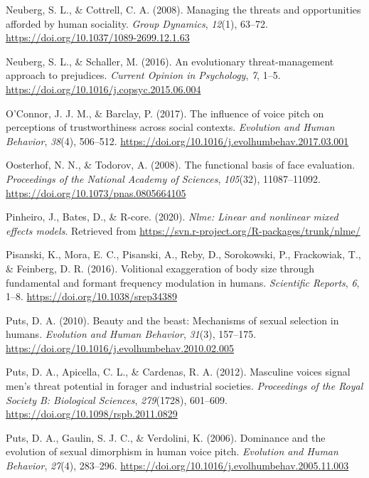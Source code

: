 \documentclass[
  english,
  man, noextraspace,floatsintext]{apa6}
\newlength{\cslhangindent}
\newenvironment{cslreferences}%
  {\setlength{\parindent}{0pt}%
  \everypar{\setlength{\hangindent}{\cslhangindent}}\ignorespaces}%
  {\par}
\begin{document}
\begin{cslreferences}
\leavevmode\hypertarget{ref-Neuberg2008}{}%
Neuberg, S. L., \& Cottrell, C. A. (2008). Managing the threats and opportunities afforded by human sociality. \emph{Group Dynamics}, \emph{12}(1), 63--72. \url{https://doi.org/10.1037/1089-2699.12.1.63}

\leavevmode\hypertarget{ref-Neuberg2016}{}%
Neuberg, S. L., \& Schaller, M. (2016). An evolutionary threat-management approach to prejudices. \emph{Current Opinion in Psychology}, \emph{7}, 1--5. \url{https://doi.org/10.1016/j.copsyc.2015.06.004}

\leavevmode\hypertarget{ref-OConnor2017}{}%
O'Connor, J. J. M., \& Barclay, P. (2017). The influence of voice pitch on perceptions of trustworthiness across social contexts. \emph{Evolution and Human Behavior}, \emph{38}(4), 506--512. \url{https://doi.org/10.1016/j.evolhumbehav.2017.03.001}

\leavevmode\hypertarget{ref-Oosterhof2008}{}%
Oosterhof, N. N., \& Todorov, A. (2008). The functional basis of face evaluation. \emph{Proceedings of the National Academy of Sciences}, \emph{105}(32), 11087--11092. \url{https://doi.org/10.1073/pnas.0805664105}

\leavevmode\hypertarget{ref-R-nlme}{}%
Pinheiro, J., Bates, D., \& R-core. (2020). \emph{Nlme: Linear and nonlinear mixed effects models}. Retrieved from \url{https://svn.r-project.org/R-packages/trunk/nlme/}

\leavevmode\hypertarget{ref-Pisanski2016}{}%
Pisanski, K., Mora, E. C., Pisanski, A., Reby, D., Sorokowski, P., Frackowiak, T., \& Feinberg, D. R. (2016). Volitional exaggeration of body size through fundamental and formant frequency modulation in humans. \emph{Scientific Reports}, \emph{6}, 1--8. \url{https://doi.org/10.1038/srep34389}

\leavevmode\hypertarget{ref-Puts2010}{}%
Puts, D. A. (2010). Beauty and the beast: Mechanisms of sexual selection in humans. \emph{Evolution and Human Behavior}, \emph{31}(3), 157--175. \url{https://doi.org/10.1016/j.evolhumbehav.2010.02.005}

\leavevmode\hypertarget{ref-Puts2012}{}%
Puts, D. A., Apicella, C. L., \& Cardenas, R. A. (2012). Masculine voices signal men's threat potential in forager and industrial societies. \emph{Proceedings of the Royal Society B: Biological Sciences}, \emph{279}(1728), 601--609. \url{https://doi.org/10.1098/rspb.2011.0829}

\leavevmode\hypertarget{ref-Puts2006}{}%
Puts, D. A., Gaulin, S. J. C., \& Verdolini, K. (2006). Dominance and the evolution of sexual dimorphism in human voice pitch. \emph{Evolution and Human Behavior}, \emph{27}(4), 283--296. \url{https://doi.org/10.1016/j.evolhumbehav.2005.11.003}


\end{cslreferences}
\end{document}
